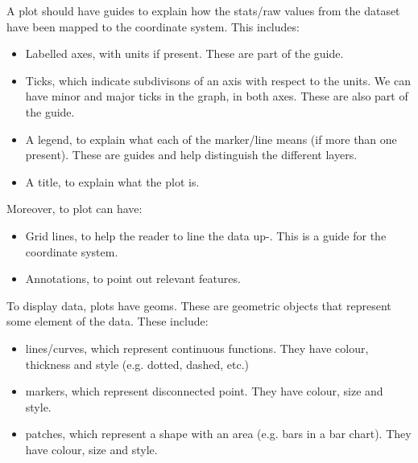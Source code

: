 \documentclass[a4paper, openany]{memoir}
\begin{document}
A plot should have guides to explain how the stats/raw values from the dataset have been mapped to the coordinate system. This includes:
\begin{itemize}
    \item Labelled axes, with units if present. These are part of the guide.
    \item Ticks, which indicate subdivisons of an axis with respect to the units. We can have minor and major ticks in the graph, in both axes. These are also part of the guide.
    \item A legend, to explain what each of the marker/line means (if more than one present). These are guides and help distinguish the different layers.
    \item A title, to explain what the plot is.
\end{itemize}

Moreover, to plot can have:
\begin{itemize}
    \item Grid lines, to help the reader to line the data up-. This is a guide for the coordinate system.
    \item Annotations, to point out relevant features.
\end{itemize}

To display data, plots have geoms. These are geometric objects that represent some element of the data. These include:
\begin{itemize}
    \item lines/curves, which represent continuous functions. They have colour, thickness and style (e.g. dotted, dashed, etc.)
    \item markers, which represent disconnected point. They have colour, size and style.
    \item patches, which represent a shape with an area (e.g. bars in a bar chart). They have colour, size and style.
\end{itemize}
\end{document}
